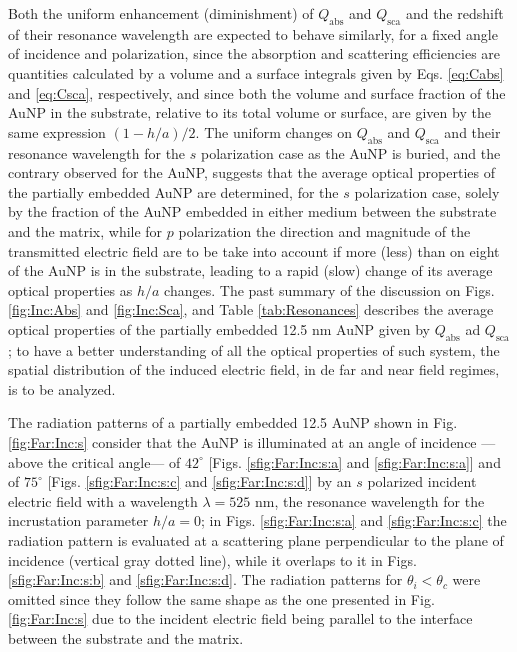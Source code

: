 Both the uniform enhancement (diminishment) of $Q_\text{abs}$ and $Q_\text{sca}$  and the  redshift of their resonance wavelength  are expected to behave similarly, for a fixed angle of incidence and polarization, since the absorption and scattering efficiencies are quantities calculated by a volume and a surface integrals given by  Eqs. \eqref{eq:Cabs} and \eqref{eq:Csca}, respectively,  and since both the volume and surface fraction of the AuNP in the substrate, relative to its total volume or surface, are given by the same expression $(1-h/a)/2$. The uniform changes on $Q_\text{abs}$ and $Q_\text{sca}$ and their resonance wavelength for the $s$ polarization case as the AuNP is buried, and the contrary observed for the AuNP, suggests that the average optical properties of the partially embedded AuNP are determined, for the $s$ polarization case, solely by the fraction of the AuNP embedded in either medium between the substrate and the matrix, while for $p$ polarization the direction and magnitude of the transmitted electric field are to be take into account if more (less) than on eight of the AuNP is in the substrate, leading to a rapid (slow) change of its average optical properties as $h/a$ changes. The past summary of the discussion on Figs. \ref{fig:Inc:Abs} and \ref{fig:Inc:Sca}, and Table \ref{tab:Resonances} describes the average optical properties of the partially embedded 12.5 nm AuNP given by $Q_\text{abs}$ ad $Q_\text{sca}$; to have a better understanding of all the optical properties of such system, the spatial distribution of the induced electric field, in de far and near field regimes, is to be analyzed.

The radiation patterns of a partially embedded 12.5 AuNP shown in Fig. \ref{fig:Far:Inc:s} consider that the AuNP is illuminated at an angle of incidence ---above the critical angle--- of $42^\circ$ [Figs. \ref{sfig:Far:Inc:s:a} and \ref{sfig:Far:Inc:s:a}] and of $75^\circ$ [Figs. \ref{sfig:Far:Inc:s:c} and \ref{sfig:Far:Inc:s:d}] by an $s$ polarized incident electric field with a wavelength $\lambda = 525$ nm, the resonance wavelength for the incrustation parameter $h/a = 0$; in Figs. \ref{sfig:Far:Inc:s:a} and   \ref{sfig:Far:Inc:s:c} the radiation pattern is evaluated at a scattering plane perpendicular to the plane of incidence (vertical gray dotted line), while it overlaps to it in  Figs. \ref{sfig:Far:Inc:s:b} and   \ref{sfig:Far:Inc:s:d}. The radiation patterns for $\theta_i<\theta_c$ were omitted since they follow the same shape as the one presented in Fig. \ref{fig:Far:Inc:s} due to the incident electric field being parallel to the interface between the substrate and the matrix.

